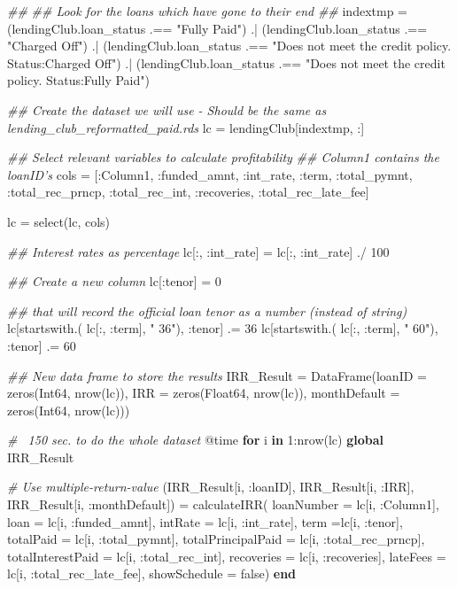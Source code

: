 \documentclass[11pt,]{report}
\newenvironment{Shaded}{\begin{snugshade}}{\end{snugshade}}
\newcommand{\CommentTok}[1]{\textcolor[rgb]{0.56,0.35,0.01}{\textit{#1}}}
\newcommand{\DataTypeTok}[1]{\textcolor[rgb]{0.13,0.29,0.53}{#1}}
\newcommand{\FloatTok}[1]{\textcolor[rgb]{0.00,0.00,0.81}{#1}}
\newcommand{\KeywordTok}[1]{\textcolor[rgb]{0.13,0.29,0.53}{\textbf{#1}}}
\newcommand{\NormalTok}[1]{#1}
\newcommand{\StringTok}[1]{\textcolor[rgb]{0.31,0.60,0.02}{#1}}
\begin{document}
\begin{Shaded}
\begin{Highlighting}[numbers=left,,]
\CommentTok{##}
\CommentTok{## Look for the loans which have gone to their end}
\CommentTok{##}
\NormalTok{indextmp = (lendingClub.loan_status .== }\StringTok{"Fully Paid"}\NormalTok{) .|}
\NormalTok{           (lendingClub.loan_status .== }\StringTok{"Charged Off"}\NormalTok{) .|}
\NormalTok{           (lendingClub.loan_status .== }\StringTok{"Does not meet the credit policy. Status:Charged Off"}\NormalTok{) .|}
\NormalTok{           (lendingClub.loan_status .== }\StringTok{"Does not meet the credit policy. Status:Fully Paid"}\NormalTok{)}

\CommentTok{## Create the dataset we will use - Should be the same as lending_club_reformatted_paid.rds}
\NormalTok{lc = lendingClub[indextmp, :]}

\CommentTok{## Select relevant variables to calculate profitability}
\CommentTok{## Column1 contains the loanID's}
\NormalTok{cols = [:Column1, :funded_amnt, :int_rate, :term,}
\NormalTok{        :total_pymnt, :total_rec_prncp, :total_rec_int,}
\NormalTok{        :recoveries, :total_rec_late_fee]}

\NormalTok{lc = select(lc, cols)}

\CommentTok{## Interest rates as percentage}
\NormalTok{lc[:, :int_rate] = lc[:, :int_rate] ./ }\FloatTok{100}

\CommentTok{## Create a new column}
\NormalTok{lc[:tenor] = }\FloatTok{0}

\CommentTok{## that will record the official loan tenor as a number (instead of string)}
\NormalTok{lc[startswith.( lc[:, :term], }\StringTok{" 36"}\NormalTok{), :tenor] .= }\FloatTok{36}
\NormalTok{lc[startswith.( lc[:, :term], }\StringTok{" 60"}\NormalTok{), :tenor] .= }\FloatTok{60}

\CommentTok{## New data frame to store the results}
\NormalTok{IRR_Result = DataFrame(loanID = zeros(}\DataTypeTok{Int64}\NormalTok{, nrow(lc)),}
\NormalTok{                       IRR = zeros(}\DataTypeTok{Float64}\NormalTok{, nrow(lc)),}
\NormalTok{                       monthDefault = zeros(}\DataTypeTok{Int64}\NormalTok{, nrow(lc)))}


\CommentTok{# ~150 sec. to do the whole dataset}
\NormalTok{@time }\KeywordTok{for}\NormalTok{ i }\KeywordTok{in} \FloatTok{1}\NormalTok{:nrow(lc)}
  \KeywordTok{global}\NormalTok{ IRR_Result}

  \CommentTok{# Use multiple-return-value}
\NormalTok{  (IRR_Result[i, :loanID], IRR_Result[i, :IRR], IRR_Result[i, :monthDefault]) =}
\NormalTok{      calculateIRR(}
\NormalTok{          loanNumber = lc[i, :Column1],}
\NormalTok{          loan = lc[i, :funded_amnt], intRate = lc[i, :int_rate], term =lc[i, :tenor],}
\NormalTok{          totalPaid = lc[i, :total_pymnt], totalPrincipalPaid = lc[i, :total_rec_prncp],}
\NormalTok{          totalInterestPaid = lc[i, :total_rec_int],}
\NormalTok{          recoveries = lc[i, :recoveries], lateFees = lc[i, :total_rec_late_fee],}
\NormalTok{          showSchedule = false)}
\KeywordTok{end}



\end{Highlighting}
\end{Shaded}
\end{document}

